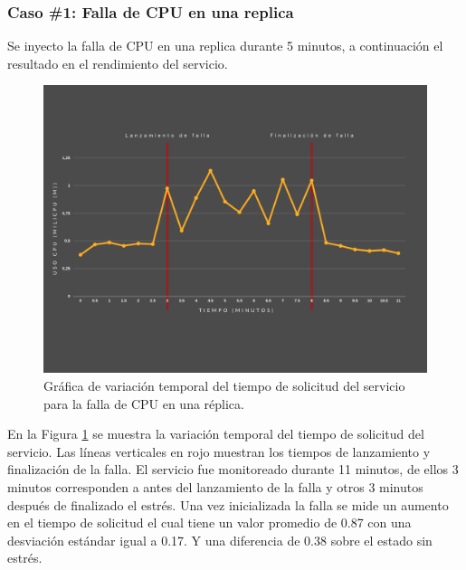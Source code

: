 \subsubsection{Caso \#1: Falla de CPU en una replica}
\label{sec:falla_cpu_exp}


\par Se inyecto la falla de CPU en una replica durante 5 minutos, a continuación el resultado en el rendimiento del servicio.\\

\begin{figure}[htpb!]
	\centering
	\includegraphics[width=0.95\columnwidth]{images/graficasexperimentos/CPU1.png}
	\caption{Gráfica de variación temporal del tiempo de solicitud del servicio para la falla de CPU en una r\'eplica.}
	\label{fig:cpu01}
\end{figure}

\par En la Figura \ref{fig:cpu01} se muestra la variación temporal del tiempo de solicitud del servicio. Las líneas verticales en rojo muestran los tiempos de lanzamiento y finalización de la falla. El servicio fue monitoreado durante 11 minutos, de ellos 3 minutos corresponden a antes del lanzamiento de la falla y otros 3 minutos después de finalizado el estrés. Una vez inicializada la falla se mide un aumento en el tiempo de solicitud el cual tiene un valor promedio de 0.87 con una desviación estándar igual a 0.17. Y una diferencia de 0.38 sobre el estado sin estrés.\\


